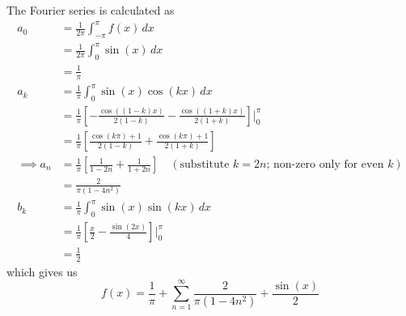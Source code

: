 \documentclass[a4paper]{article}
\begin{document}
The Fourier series is calculated as 
\begin{align*}
	a_{0} & = \frac{1}{2 \pi} \int^{\pi}_{-\pi} f \!\left( x \right) \, dx \\
	 & = \frac{1}{2 \pi} \int^{\pi}_{0} \sin\!\left(x\right) \, dx \\ 
	 & = \frac{1}{\pi} \\
	a_{k} & = \frac{1}{\pi} \int^{\pi}_{0} \sin\!\left(x\right) \cos\!\left(kx\right) \, dx \\
	      & = \frac{1}{\pi} \!\left[ -\frac{\cos\!\left(\!\left( 1 - k \right)x\right) }{2 \!\left( 1 - k \right)} - \frac{\cos\!\left(\!\left( 1 + k \right)x\right) }{2 \!\left( 1 + k \right)} \right] \Big|^{\pi}_{0} \\
	      & = \frac{1}{\pi} \!\left[ \frac{\cos\!\left(k \pi\right) + 1}{2 \!\left( 1 - k \right)} + \frac{\cos\!\left(k \pi\right) + 1}{2 \!\left( 1 + k \right)} \right] \\
\implies a_{n} & = \frac{1}{\pi} \!\left[ \frac{1}{1 - 2n} + \frac{1}{1 + 2n} \right] \quad (\text{substitute } k = 2n \text{; non-zero only for even } k) \\
	      & = \frac{2}{\pi \!\left( 1 - 4n^{2} \right)} \\
	b_{k} & = \frac{1}{\pi} \int^{\pi}_{0} \sin\!\left(x\right) \sin\!\left(kx\right) \, dx \\
	      & = \frac{1}{\pi}\!\left[ \frac{x}{2} - \frac{\sin\!\left(2x\right) }{4} \right] \Big|^{\pi}_{0} \\
	      & = \frac{1}{2}
\end{align*}
which gives us
\[
	f \!\left( x \right) = \frac{1}{\pi} + \sum_{n = 1}^{\infty} \frac{2}{\pi \!\left( 1 - 4n^{2} \right)} + \frac{\sin\!\left(x\right) }{2} 
\]

\end{document}
